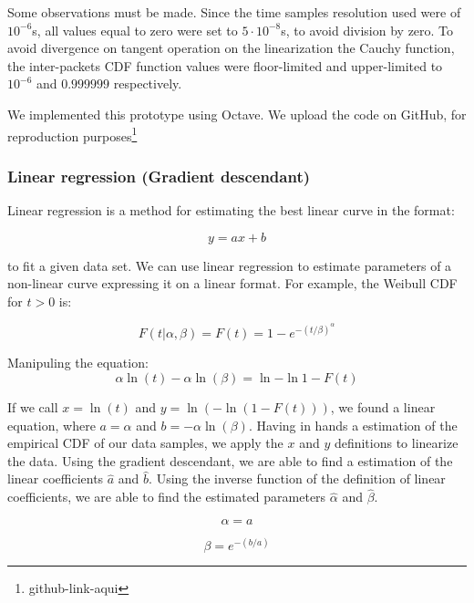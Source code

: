 Some observations must be made. Since the time samples resolution used were of $10^{-6}$s, all values equal to zero were set to  $5\cdot10^{-8}$s, to avoid division by zero. To avoid divergence on tangent operation on the linearization the Cauchy function, the inter-packets CDF function values were floor-limited and upper-limited to  $10^{-6}$ and $0.999999$ respectively.

We implemented this prototype using Octave. We upload the code on GitHub, for reproduction purposes\footnote{github-link-aqui}

\subsubsection{Linear regression (Gradient descendant)}

Linear regression is a method for estimating the best linear curve in the format:

\begin{equation}
y = ax + b
\end{equation}

to fit a given data set. We can use linear regression to estimate parameters of a non-linear curve expressing it on a linear format. For example, the Weibull CDF for $t > 0$ is:

\begin{equation}
F(t|\alpha, \beta) = F(t) = 1 - e^{-(t/\beta)^{\alpha}}
\end{equation}

Manipuling the equation:
\begin{equation}
\alpha\ln{(t)} - \alpha\ln{(\beta)} = \ln{-\ln{1 - F(t)}}
\end{equation}

If we call $x = \ln{(t)}$ and $y = \ln{(-\ln{(1 - F(t))})}$, we found a linear equation, where $a = \alpha$ and $b = -\alpha\ln{(\beta)}$. Having in hands a estimation of the empirical CDF of our data samples, we apply the $x$ and $y$ definitions to linearize the data. Using the gradient descendant, we are able to find a estimation of the linear coefficients $\hat{a}$ and $\hat{b}$. Using the inverse function of the definition of linear coefficients, we are able to find the estimated parameters $\hat{\alpha}$ and $\hat{\beta}$.

\begin{equation}
\alpha = a
\end{equation}

\begin{equation}
\beta = e^{-(b/a)}
\end{equation}

